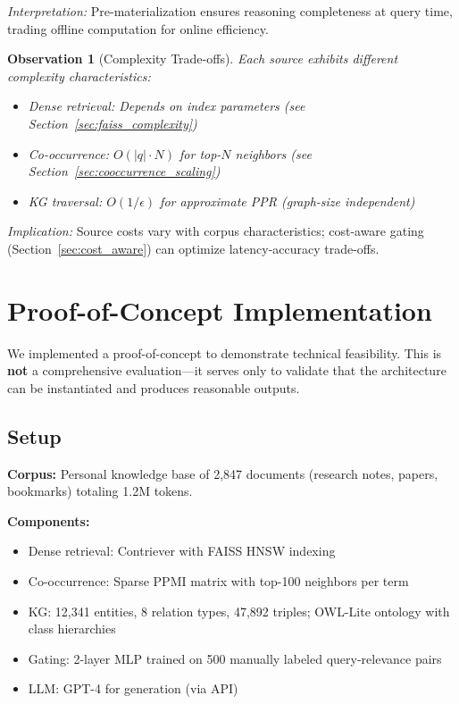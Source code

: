 \documentclass[11pt,a4paper]{article}
\newtheorem{observation}{Observation}
\begin{document}
\textit{Interpretation:} Pre-materialization ensures reasoning completeness at query time, trading offline computation for online efficiency.

\begin{observation}[Complexity Trade-offs]
\label{obs:complexity}
Each source exhibits different complexity characteristics:
\begin{itemize}
    \item Dense retrieval: Depends on index parameters (see Section~\ref{sec:faiss_complexity})
    \item Co-occurrence: $O(|q| \cdot N)$ for top-$N$ neighbors (see Section~\ref{sec:cooccurrence_scaling})
    \item KG traversal: $O(1/\epsilon)$ for approximate PPR (graph-size independent)
\end{itemize}
\end{observation}

\textit{Implication:} Source costs vary with corpus characteristics; cost-aware gating (Section~\ref{sec:cost_aware}) can optimize latency-accuracy trade-offs.

\section{Proof-of-Concept Implementation}
\label{sec:poc}

We implemented a proof-of-concept to demonstrate technical feasibility. This is \textbf{not} a comprehensive evaluation---it serves only to validate that the architecture can be instantiated and produces reasonable outputs.

\subsection{Setup}

\textbf{Corpus:} Personal knowledge base of 2,847 documents (research notes, papers, bookmarks) totaling 1.2M tokens.

\textbf{Components:}
\begin{itemize}
    \item Dense retrieval: Contriever with FAISS HNSW indexing
    \item Co-occurrence: Sparse PPMI matrix with top-100 neighbors per term
    \item KG: 12,341 entities, 8 relation types, 47,892 triples; OWL-Lite ontology with class hierarchies
    \item Gating: 2-layer MLP trained on 500 manually labeled query-relevance pairs
    \item LLM: GPT-4 for generation (via API)
\end{itemize}
\end{document}
